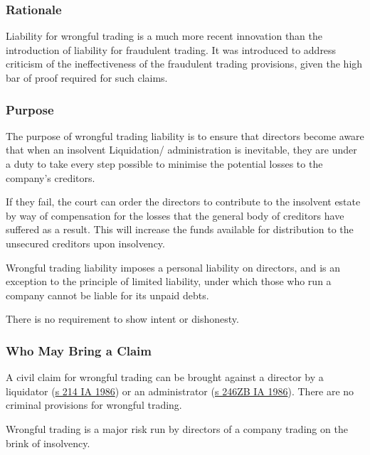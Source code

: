 \documentclass[
]{article}
\begin{document}
\hypertarget{rationale}{%
\subsubsection{Rationale}\label{rationale}}

Liability for wrongful trading is a much more recent innovation than the
introduction of liability for fraudulent trading. It was introduced to
address criticism of the ineffectiveness of the fraudulent trading
provisions, given the high bar of proof required for such claims.

\hypertarget{purpose}{%
\subsubsection{Purpose}\label{purpose}}

The purpose of wrongful trading liability is to ensure that directors
become aware that when an insolvent Liquidation/ administration is
inevitable, they are under a duty to take every step possible to
minimise the potential losses to the company's creditors.

If they fail, the court can order the directors to contribute to the
insolvent estate by way of compensation for the losses that the general
body of creditors have suffered as a result. This will increase the
funds available for distribution to the unsecured creditors upon
insolvency.

Wrongful trading liability imposes a personal liability on directors,
and is an exception to the principle of limited liability, under which
those who run a company cannot be liable for its unpaid debts.

There is no requirement to show intent or dishonesty.

\hypertarget{who-may-bring-a-claim}{%
\subsubsection{Who May Bring a Claim}\label{who-may-bring-a-claim}}

A civil claim for wrongful trading can be brought against a director by
a liquidator
(\href{https://www.legislation.gov.uk/ukpga/1986/45/section/214}{s 214
IA 1986}) or an administrator
(\href{https://www.legislation.gov.uk/ukpga/1986/45/section/246ZB}{s
246ZB IA 1986}). There are no criminal provisions for wrongful trading.

Wrongful trading is a major risk run by directors of a company trading
on the brink of insolvency.
\end{document}
